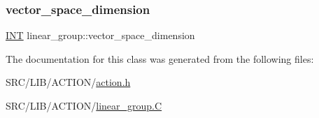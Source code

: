 \subsubsection{\texorpdfstring{vector\+\_\+space\+\_\+dimension}{vector\_space\_dimension}}
{\footnotesize\ttfamily \mbox{\hyperlink{galois_8h_a09fddde158a3a20bd2dcadb609de11dc}{I\+NT}} linear\+\_\+group\+::vector\+\_\+space\+\_\+dimension}



The documentation for this class was generated from the following files\+:\begin{DoxyCompactItemize}
\item 
S\+R\+C/\+L\+I\+B/\+A\+C\+T\+I\+O\+N/\mbox{\hyperlink{action_8h}{action.\+h}}\item 
S\+R\+C/\+L\+I\+B/\+A\+C\+T\+I\+O\+N/\mbox{\hyperlink{linear__group_8_c}{linear\+\_\+group.\+C}}\end{DoxyCompactItemize}
